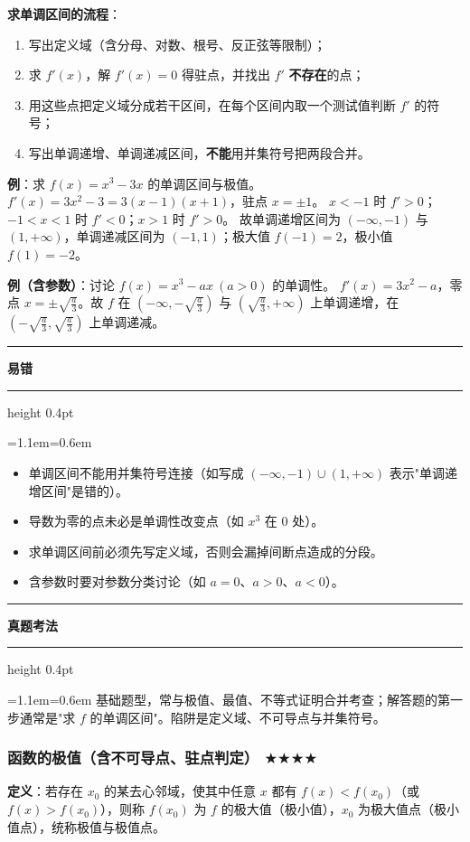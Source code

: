 \documentclass[11pt,openany,UTF8]{ctexbook}
\newcommand{\callouthead}[2]{%
  \par\addvspace{7pt}\noindent
  {\color{#1}\rule[-0.15em]{3pt}{1.05em}}\hspace{0.5em}%
  {\bfseries\color{#1}#2}\par\nobreak\vspace{-0.35em}%
  {\color{rulesep}\hrule height 0.4pt}\nobreak\vspace{0.45em}%
  \begingroup\small\setlength{\parindent}{0pt}%
  \leftskip=1.1em\rightskip=0.6em\noindent\ignorespaces}
\newcommand{\calloutend}{\par\endgroup\addvspace{7pt}}
\newenvironment{callwarn}[1]{\callouthead{warnbar}{#1}}{\calloutend}
\newenvironment{callexam}[1]{\callouthead{exambar}{#1}}{\calloutend}
\begin{document}
\textbf{求单调区间的流程}：

\begin{enumerate}
\item 写出定义域（含分母、对数、根号、反正弦等限制）；
\item 求 $f'(x)$，解 $f'(x)=0$ 得驻点，并找出 $f'$ \textbf{不存在}的点；
\item 用这些点把定义域分成若干区间，在每个区间内取一个测试值判断 $f'$ 的符号；
\item 写出单调递增、单调递减区间，\textbf{不能}用并集符号把两段合并。
\end{enumerate}
\textbf{例}：求 $f(x)=x^3-3x$ 的单调区间与极值。 $f'(x)=3x^2-3=3(x-1)(x+1)$，驻点 $x=\pm1$。 $x<-1$ 时 $f'>0$；$-1<x<1$ 时 $f'<0$；$x>1$ 时 $f'>0$。 故单调递增区间为 $(-\infty,-1)$ 与 $(1,+\infty)$，单调递减区间为 $(-1,1)$；极大值 $f(-1)=2$，极小值 $f(1)=-2$。

\textbf{例（含参数）}：讨论 $f(x)=x^3-ax\ (a>0)$ 的单调性。 $f'(x)=3x^2-a$，零点 $x=\pm\sqrt{\frac a3}$。故 $f$ 在 $\left(-\infty,-\sqrt{\frac a3}\right)$ 与 $\left(\sqrt{\frac a3},+\infty\right)$ 上单调递增，在 $\left(-\sqrt{\frac a3},\sqrt{\frac a3}\right)$ 上单调递减。

\begin{callwarn}{易错}
\begin{itemize}
\item 单调区间不能用并集符号连接（如写成 $(-\infty,-1)\cup(1,+\infty)$ 表示"单调递增区间"是错的）。
\item 导数为零的点未必是单调性改变点（如 $x^3$ 在 $0$ 处）。
\item 求单调区间前必须先写定义域，否则会漏掉间断点造成的分段。
\item 含参数时要对参数分类讨论（如 $a=0$、$a>0$、$a<0$）。
\end{itemize}
\end{callwarn}

\begin{callexam}{真题考法}
基础题型，常与极值、最值、不等式证明合并考查；解答题的第一步通常是"求 $f$ 的单调区间"。陷阱是定义域、不可导点与并集符号。

\end{callexam}

\subsubsection{函数的极值（含不可导点、驻点判定） $\bigstar$$\bigstar$$\bigstar$$\bigstar$}

\textbf{定义}：若存在 $x_0$ 的某去心邻域，使其中任意 $x$ 都有 $f(x)<f(x_0)$（或 $f(x)>f(x_0)$），则称 $f(x_0)$ 为 $f$ 的极大值（极小值），$x_0$ 为极大值点（极小值点），统称极值与极值点。
\end{document}
